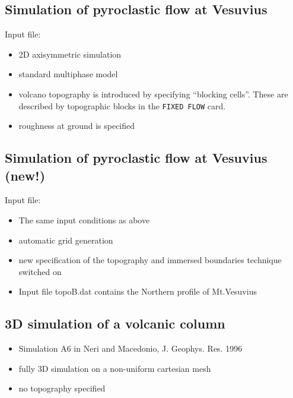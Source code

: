 \newpage
\subsection{Simulation of pyroclastic flow at Vesuvius}
Input file: 
\begin{itemize}
\item 2D axisymmetric simulation
\item standard multiphase model
\item volcano topography is introduced by specifying ``blocking cells''.
These are described by topographic blocks in the {\tt FIXED FLOW} card.
\item roughness at ground is specified
\end{itemize}
%
\newpage
\subsection{Simulation of pyroclastic flow at Vesuvius (new!)}
Input file: 
\begin{itemize}
\item The same input conditions as above 
\item automatic grid generation
\item new specification of the topography and
      immersed boundaries technique switched on
\item Input file topoB.dat contains the Northern profile of Mt.Vesuvius 
\end{itemize}

%
\newpage
\subsection{3D simulation of a volcanic column}
\begin{itemize}
\item Simulation A6 in Neri and Macedonio, {J. Geophys. Res.} 1996
\item fully 3D simulation on a non-uniform cartesian mesh
\item no topography specified
\end{itemize}
